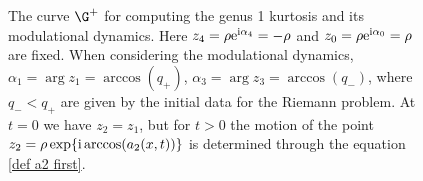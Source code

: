 \begin{figure}
{\begin{tikzpicture}[x=0.75pt,y=0.75pt,yscale=-1,xscale=1]
	
\end{tikzpicture}

   }
    \caption{The curve $\G^+$ for computing the genus 1 kurtosis and its modulational dynamics. Here $z_4=\rho {\rm e}^{{\rm i}\alpha_4}=-\rho$ and $z_0=\rho {\rm e}^{{\rm i}\alpha_0}=\rho$ are fixed. When considering the modulational dynamics, $\alpha_1=\arg z_1=\arccos(q_+)$, $\alpha_3=\arg z_3=\arccos(q_-)$, where $q_-<q_+$ are given by the initial data for the Riemann problem.  At $t=0$  we have $z_2=z_1$, but for $t>0$  the motion of the point $z_2=\rho\exp\{{\rm i}\arccos(a_2(x,t))\}$ is determined through the equation \eqref{def a2 first}.}
    \label{fig:DSW-spectrum}
\end{figure} 